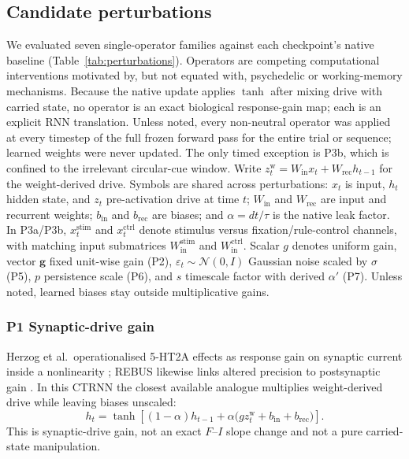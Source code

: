 \documentclass[11pt,reprint,aps,prl,floatfix,secnumarabic]{revtex4-2}
\begin{document}
\subsection{Candidate perturbations}

We evaluated seven single-operator families against each checkpoint's native
baseline (Table~\ref{tab:perturbations}). Operators are competing computational
interventions motivated by, but not equated with, psychedelic or working-memory
mechanisms. Because the native update applies $\tanh$ after mixing drive with
carried state, no operator is an exact biological response-gain map; each is an
explicit RNN translation. Unless noted, every non-neutral operator was applied
at every timestep of the full frozen forward pass for the entire trial or
sequence; learned weights were never updated. The only timed exception is P3b,
which is confined to the irrelevant circular-cue window. Write
$z_t^{\mathrm{w}}=W_{\mathrm{in}}x_t+W_{\mathrm{rec}}h_{t-1}$ for the
weight-derived drive. Symbols are shared across perturbations:
$x_t$ is input, $h_t$ hidden state, and $z_t$ pre-activation drive at time
$t$; $W_{\mathrm{in}}$ and $W_{\mathrm{rec}}$ are input and recurrent weights;
$b_{\mathrm{in}}$ and $b_{\mathrm{rec}}$ are biases; and $\alpha=dt/\tau$ is
the native leak factor. In P3a/P3b, $x_t^{\mathrm{stim}}$ and
$x_t^{\mathrm{ctrl}}$ denote stimulus versus fixation/rule-control channels,
with matching input submatrices $W_{\mathrm{in}}^{\mathrm{stim}}$ and
$W_{\mathrm{in}}^{\mathrm{ctrl}}$. Scalar $g$ denotes uniform gain, vector
$\mathbf{g}$ fixed unit-wise gain (P2), $\varepsilon_t\sim\mathcal{N}(0,I)$
Gaussian noise scaled by $\sigma$ (P5), $p$ persistence scale (P6), and $s$
timescale factor with derived $\alpha'$ (P7). Unless noted, learned biases
stay outside multiplicative gains.

\subsubsection{P1 Synaptic-drive gain}
Herzog et al.\ operationalised 5-HT2A effects as response gain on synaptic
current inside a nonlinearity \cite{herzog2023}; REBUS likewise links altered
precision to postsynaptic gain \cite{carhartharris2019}. In this CTRNN the
closest available analogue multiplies weight-derived drive while leaving
biases unscaled:
\begin{equation}
 h_t=\tanh\!\left[
 (1-\alpha)h_{t-1}+\alpha\bigl(g z_t^{\mathrm{w}}+b_{\mathrm{in}}+b_{\mathrm{rec}}\bigr)
 \right].
 \label{eq:p1}
\end{equation}
This is synaptic-drive gain, not an exact $F$--$I$ slope change and not a pure
carried-state manipulation.
\end{document}

